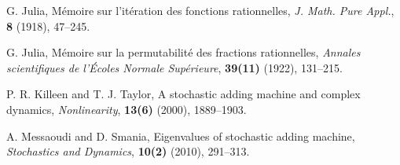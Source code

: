 \documentclass[11pt]{amsart}
\theoremstyle{definition}
\begin{document}
\begin{thebibliography}{99}
\newblock G. Julia,
\newblock  M\'emoire sur l'it\'eration des fonctions rationnelles,
\newblock  \emph{J. Math. Pure Appl.}, \textbf{8} (1918), 47--245.

\newblock G. Julia,
\newblock  M\'emoire sur la permutabilit\'e des fractions rationnelles,
\newblock  \emph{Annales scientifiques de l'\'Ecoles Normale Sup\'erieure}, \textbf{39(11)} (1922), 131--215.

\newblock P. R. Killeen and T. J. Taylor,
\newblock  A stochastic adding machine and complex dynamics,
\newblock  \emph{Nonlinearity}, \textbf{13(6)} (2000), 1889–1903.

\newblock A. Messaoudi and D. Smania,
\newblock Eigenvalues of stochastic adding machine,
\newblock \emph{Stochastics and Dynamics}, \textbf{10(2)} (2010), 291--313.

\end{thebibliography}
\end{document}
